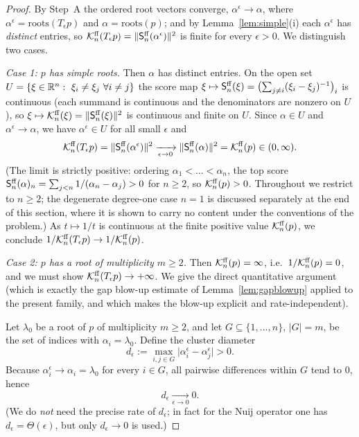 \begin{proof}
By Step~A the ordered root vectors converge, $\alpha^\epsilon\to\alpha$, where
$\alpha^\epsilon=\mathrm{roots}(T_\epsilon p)$ and $\alpha=\mathrm{roots}(p)$; and by
Lemma~\ref{lem:simple}(i) each $\alpha^\epsilon$ has \emph{distinct} entries, so
$\mathcal{K}^{\mathrm{ff}}_n(T_\epsilon p)=\|\mathsf{S}^{\mathrm{ff}}_n(\alpha^\epsilon)\|^2$ is finite for every
$\epsilon>0$. We distinguish two cases.

\smallskip\noindent\emph{Case 1: $p$ has simple roots.} Then $\alpha$ has distinct
entries. On the open set $U=\{\xi\in\mathbb{R}^n:\ \xi_i\ne\xi_j\ \forall i\ne j\}$ the
score map $\xi\mapsto\mathsf{S}^{\mathrm{ff}}_n(\xi)=\bigl(\sum_{j\ne i}(\xi_i-\xi_j)^{-1}\bigr)_i$
is continuous (each summand is continuous and the denominators are nonzero on $U$),
so $\xi\mapsto\mathcal{K}^{\mathrm{ff}}_n(\xi)=\|\mathsf{S}^{\mathrm{ff}}_n(\xi)\|^2$ is continuous and finite on $U$.
Since $\alpha\in U$ and $\alpha^\epsilon\to\alpha$, we have $\alpha^\epsilon\in U$ for
all small $\epsilon$ and
\[
\mathcal{K}^{\mathrm{ff}}_n(T_\epsilon p)=\|\mathsf{S}^{\mathrm{ff}}_n(\alpha^\epsilon)\|^2
\xrightarrow[\epsilon\to0]{}\|\mathsf{S}^{\mathrm{ff}}_n(\alpha)\|^2=\mathcal{K}^{\mathrm{ff}}_n(p)\in(0,\infty).
\]
(The limit is strictly positive: ordering $\alpha_1<\dots<\alpha_n$, the top score
$\mathsf{S}^{\mathrm{ff}}_n(\alpha)_n=\sum_{j<n}1/(\alpha_n-\alpha_j)>0$ for $n\ge2$, so
$\mathcal{K}^{\mathrm{ff}}_n(p)>0$. Throughout we restrict to $n\ge2$; the degenerate degree-one
case $n=1$ is discussed separately at the end of this section, where it is shown to
carry no content under the conventions of the problem.)
As $t\mapsto1/t$ is continuous at the finite positive value $\mathcal{K}^{\mathrm{ff}}_n(p)$, we
conclude $1/\mathcal{K}^{\mathrm{ff}}_n(T_\epsilon p)\to1/\mathcal{K}^{\mathrm{ff}}_n(p)$.

\smallskip\noindent\emph{Case 2: $p$ has a root of multiplicity $m\ge2$.} Then
$\mathcal{K}^{\mathrm{ff}}_n(p)=\infty$, i.e.\ $1/\mathcal{K}^{\mathrm{ff}}_n(p)=0$, and we must show
$\mathcal{K}^{\mathrm{ff}}_n(T_\epsilon p)\to+\infty$. We give the direct quantitative argument
(which is exactly the gap blow-up estimate of Lemma~\ref{lem:gapblowup} applied to
the present family, and which makes the blow-up explicit and rate-independent).

Let $\lambda_0$ be a root of $p$ of multiplicity $m\ge2$, and let
$G\subseteq\{1,\dots,n\}$, $|G|=m$, be the set of indices with $\alpha_i=\lambda_0$.
Define the cluster diameter
\[
d_\epsilon:=\max_{i,j\in G}\bigl|\alpha^\epsilon_i-\alpha^\epsilon_j\bigr|>0 .
\]
Because $\alpha^\epsilon_i\to\alpha_i=\lambda_0$ for every $i\in G$, all pairwise
differences within $G$ tend to $0$, hence
\begin{equation}\label{eq:deps}
d_\epsilon\xrightarrow[\epsilon\to0]{}0 .
\end{equation}
(We do \emph{not} need the precise rate of $d_\epsilon$; in fact for the Nuij
operator one has $d_\epsilon=\Theta(\epsilon)$, but only $d_\epsilon\to0$ is used.)


\end{proof}

